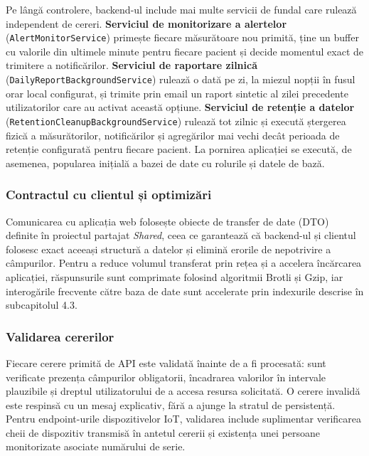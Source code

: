 \documentclass[12pt,a4paper]{article}
\begin{document}
Pe lângă controlere, backend-ul include mai multe servicii de fundal care rulează independent de cereri. \textbf{Serviciul de monitorizare a alertelor} (\texttt{AlertMonitorService}) primește fiecare măsurătoare nou primită, ține un buffer cu valorile din ultimele minute pentru fiecare pacient și decide momentul exact de trimitere a notificărilor. \textbf{Serviciul de raportare zilnică} (\texttt{DailyReportBackgroundService}) rulează o dată pe zi, la miezul nopții în fusul orar local configurat, și trimite prin email un raport sintetic al zilei precedente utilizatorilor care au activat această opțiune. \textbf{Serviciul de retenție a datelor} (\texttt{RetentionCleanupBackgroundService}) rulează tot zilnic și execută ștergerea fizică a măsurătorilor, notificărilor și agregărilor mai vechi decât perioada de retenție configurată pentru fiecare pacient. La pornirea aplicației se execută, de asemenea, popularea inițială a bazei de date cu rolurile și datele de bază.

\subsubsection{Contractul cu clientul și optimizări}

Comunicarea cu aplicația web folosește obiecte de transfer de date (DTO) definite în proiectul partajat \textit{Shared}, ceea ce garantează că backend-ul și clientul folosesc exact aceeași structură a datelor și elimină erorile de nepotrivire a câmpurilor. Pentru a reduce volumul transferat prin rețea și a accelera încărcarea aplicației, răspunsurile sunt comprimate folosind algoritmii Brotli și Gzip, iar interogările frecvente către baza de date sunt accelerate prin indexurile descrise în subcapitolul 4.3.

\subsubsection{Validarea cererilor}

Fiecare cerere primită de API este validată înainte de a fi procesată: sunt verificate prezența câmpurilor obligatorii, încadrarea valorilor în intervale plauzibile și dreptul utilizatorului de a accesa resursa solicitată. O cerere invalidă este respinsă cu un mesaj explicativ, fără a ajunge la stratul de persistență. Pentru endpoint-urile dispozitivelor IoT, validarea include suplimentar verificarea cheii de dispozitiv transmisă în antetul cererii și existența unei persoane monitorizate asociate numărului de serie.
\end{document}
